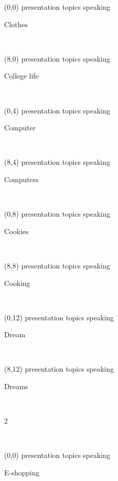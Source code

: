 \documentclass[a4paper]{article}
\newcommand{\mycard}[5]{%
	\small #1 #2
	\par
	\parbox[t][6.7cm][c]{9.5cm}{%
	\hspace{0.1cm} \Large#3\\
	\normalsize#4 #5
	}
}
\begin{document}
\begin{textblock}{8}(0,0)
\mycard{presentation topics}{speaking}{\parbox{9.0cm}{
\centering Clothes    
}}{}{} 
\end{textblock}

\begin{textblock}{8}(8,0)
\mycard{presentation topics}{speaking}{\parbox{9.0cm}{
\centering College life     
}}{}{} 
\end{textblock}

\begin{textblock}{8}(0,4)
\mycard{presentation topics}{speaking}{\parbox{9.0cm}{
\centering Computer    
}}{}{} 
\end{textblock}

\begin{textblock}{8}(8,4)
\mycard{presentation topics}{speaking}{\parbox{9.0cm}{
\centering Computers  
}}{}{} 
\end{textblock}

\begin{textblock}{8}(0,8)
\mycard{presentation topics}{speaking}{\parbox{9.0cm}{
\centering Cookies    
}}{}{} 
\end{textblock}

\begin{textblock}{8}(8,8)
\mycard{presentation topics}{speaking}{\parbox{9.0cm}{
\centering Cooking      
}}{}{} 
\end{textblock}

\begin{textblock}{8}(0,12)
\mycard{presentation topics}{speaking}{\parbox{9.0cm}{
\centering Dream         
}}{}{} 
\end{textblock}

\begin{textblock}{8}(8,12)
\mycard{presentation topics}{speaking}{\parbox{9.0cm}{
\centering Dreams     
}}{}{} 
\end{textblock}

\begin{tiny}2\end{tiny}\\
\newpage

\begin{textblock}{8}(0,0)
\mycard{presentation topics}{speaking}{\parbox{9.0cm}{
\centering E-shopping  
}}{}{} 
\end{textblock}
\end{document}
